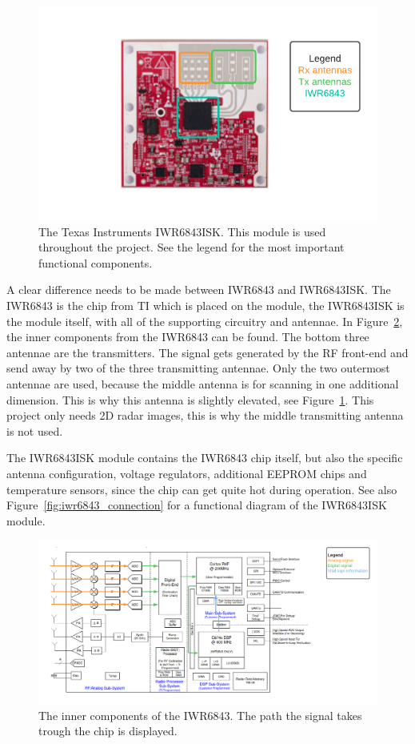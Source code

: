 \begin{figure}[t]
\centering
\includegraphics[width=.8\textwidth]{figures/background/IWR6843 legend.pdf}
\caption{The Texas Instruments IWR6843ISK. This module is used throughout the project. See the legend for the most important functional components.}
\label{fig:iwr6843isk}
\end{figure}

A clear difference needs to be made between IWR6843 and IWR6843ISK. The IWR6843 is the chip from TI which is placed on the module, the IWR6843ISK is the module itself, with all of the supporting circuitry and antennae. In Figure~\ref{fig:iwr6843_inner}, the inner components from the IWR6843 can be found. The bottom three antennae are the transmitters. The signal gets generated by the RF front-end and send away by two of the three transmitting antennae. Only the two outermost antennae are used, because the middle antenna is for scanning in one additional dimension. This is why this antenna is slightly elevated, see Figure~\ref{fig:iwr6843isk}. This project only needs 2D radar images, this is why the middle transmitting antenna is not used.

The IWR6843ISK module contains the IWR6843 chip itself, but also the specific antenna configuration, voltage regulators, additional EEPROM chips and temperature sensors, since the chip can get quite hot during operation. See also Figure~\ref{fig:iwr6843_connection} for a functional diagram of the IWR6843ISK module.


\begin{figure}[t]
\centering
\includegraphics[width=\textwidth]{figures/background/IWR inner.pdf}
\caption{The inner components of the IWR6843. The path the signal takes trough the chip is displayed.}
\label{fig:iwr6843_inner}
\end{figure}

